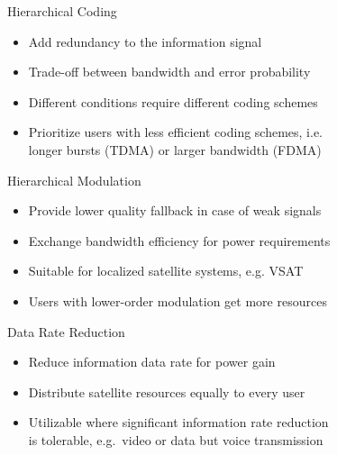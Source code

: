 \documentclass[pdf]{beamer}
\begin{document}
\begin{frame}{Hierarchical Coding}\large
  \begin{itemize}
    \item Add redundancy to the information signal
    \item Trade-off between bandwidth and error probability
    \item Different conditions require different coding schemes
    \item Prioritize users with less efficient coding schemes, i.e.\\
      longer bursts (TDMA) or larger bandwidth (FDMA)
  \end{itemize}
\end{frame}

\begin{frame}{Hierarchical Modulation}\large
  \begin{itemize}
    \item Provide lower quality fallback in case of weak signals
    \item Exchange bandwidth efficiency for power requirements
    \item Suitable for localized satellite systems, e.g. VSAT
    \item Users with lower-order modulation get more resources
  \end{itemize}
\end{frame}

\begin{frame}{Data Rate Reduction}\large
  \begin{itemize}
    \item Reduce information data rate for power gain
    \item Distribute satellite resources equally to every user
    \item Utilizable where significant information rate reduction\\
      is tolerable, e.g.\ video or data but voice transmission
  \end{itemize}
\end{frame}
\end{document}
